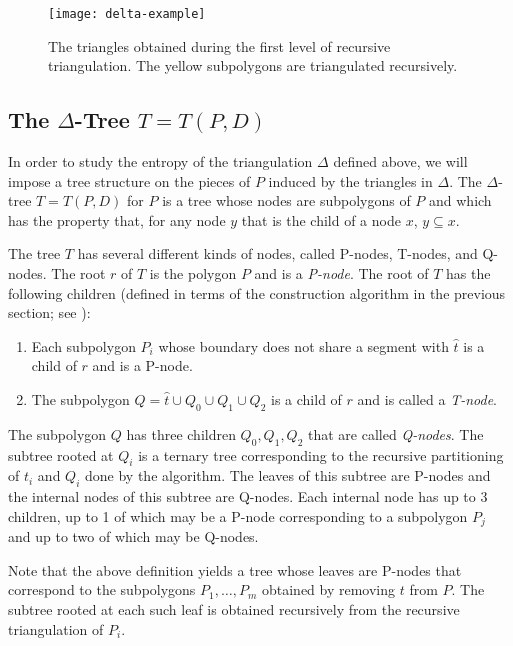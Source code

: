 \documentclass[lotsofwhite]{patmorin}
\newcommand{\z}[1]{{\hat{#1}}}
\begin{document}
\begin{figure}
  \begin{center}
      \texttt{[image: delta-example]}
  \end{center}
  \caption{The triangles obtained during the first level of recursive
triangulation.  The yellow subpolygons are triangulated recursively.}
\end{figure}

\subsection{The $\Delta$-Tree $T=T(P,D)$}

In order to study the entropy of the triangulation $\Delta$ defined
above, we will impose a tree structure on the pieces of $P$ induced by
the triangles in $\Delta$.  The $\Delta$-tree $T=T(P,D)$ for $P$ is a
tree whose nodes are subpolygons of $P$ and which has the property
that, for any node $y$ that is the child of a node $x$, $y\subseteq
x$.

The tree $T$ has several different kinds of nodes, called P-nodes,
T-nodes, and Q-nodes.  The root $r$ of $T$ is the polygon $P$ and is
a \emph{P-node}.  The root of $T$ has the following children
(defined in terms of the construction algorithm in the previous
section; see ):

\begin{enumerate}
\item Each subpolygon $P_i$ whose boundary does not share a segment
      with $\z t$ is a child of $r$ and is a P-node.  
\item The subpolygon $Q=\z t\cup Q_0\cup Q_1\cup Q_2$ is a child of $r$ and is
called a \emph{T-node}.
\end{enumerate}

The subpolygon $Q$ has three children $Q_0,Q_1,Q_2$ that are called
\emph{Q-nodes}.  The subtree rooted at $Q_i$ is a ternary tree
corresponding to the recursive partitioning of $t_i$ and $Q_i$ done by
the algorithm. The leaves of this subtree are P-nodes and the internal
nodes of this subtree are Q-nodes.  Each internal node has up to 3
children, up to 1 of which may be a P-node corresponding to a
subpolygon $P_j$ and up to two of which may be Q-nodes.

Note that the above definition yields a tree whose leaves are P-nodes
that correspond to the subpolygons $P_1,\ldots,P_m$  obtained by
removing $t$ from $P$.  The subtree rooted at each such leaf is
obtained recursively from the recursive triangulation of $P_i$.
\end{document}
